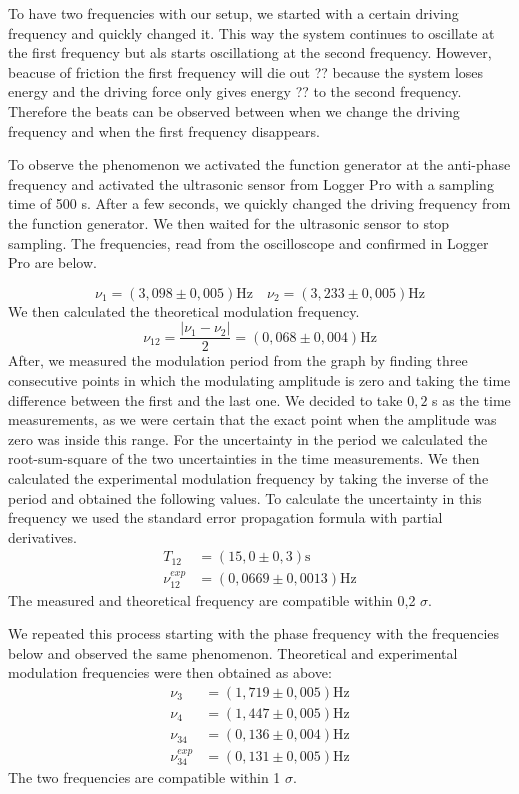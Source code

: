 \documentclass{article}
\begin{document}
To have two frequencies with our setup, we started with a certain driving frequency and quickly changed it. This way the system continues to oscillate at the first frequency but als starts oscillationg at the second frequency. However, beacuse of friction the first frequency will die out ?? because the system loses energy and the driving force only gives energy ?? to the second frequency. Therefore the beats can be observed between when we change the driving frequency and when the first frequency disappears. 

To observe the phenomenon we activated the function generator at the anti-phase frequency and activated the ultrasonic sensor from Logger Pro with a sampling time of 500 s. After a few seconds, we quickly changed the driving frequency from the function generator. We then waited for the ultrasonic sensor to stop sampling. The frequencies, read from the oscilloscope and confirmed in Logger Pro are below.

\begin{equation}
    \nu_1 = ( 3,098 \pm 0,005) \text{Hz} \quad \nu_2 = ( 3,233 \pm 0,005) \text{Hz} 
\end{equation}
We then calculated the theoretical modulation frequency.
\begin{equation}
    \nu_{12} = \frac{|\nu_1 - \nu_2|}{2} = (0,068 \pm 0,004) \text{Hz}
\end{equation}
After, we measured the modulation period from the graph by finding three consecutive points in which the modulating amplitude is zero and taking the time difference between the first and the last one. We decided to take $0,2$ s as the time measurements, as we were certain that the exact point when the amplitude was zero was inside this range. For the uncertainty in the period we calculated the root-sum-square of the two uncertainties in the time measurements. We then calculated the experimental modulation frequency by taking the inverse of the period and obtained the following values. To calculate the uncertainty in this frequency we used the standard error propagation formula with partial derivatives.
\begin{align}
    T_{12} &= (15,0 \pm 0,3) \text{s} \\
    \nu_{12}^{exp} &= (0,0669 \pm 0,0013) \text{Hz} 
\end{align}
The measured and theoretical frequency are compatible within 0,2 $\sigma$.

We repeated this process starting with the phase frequency with the frequencies below and observed the same phenomenon. Theoretical and experimental modulation frequencies were then obtained as above:
\begin{align}
    \nu_{3} &= (1,719 \pm 0,005) \text{Hz} \\
    \nu_{4} &= (1,447 \pm 0,005) \text{Hz} \\
    \nu_{34} &= (0,136 \pm 0,004) \text{Hz} \\
    \nu_{34}^{exp} &= (0,131 \pm 0,005) \text{Hz} 
\end{align}
The two frequencies are compatible within 1 $\sigma$.
\end{document}
